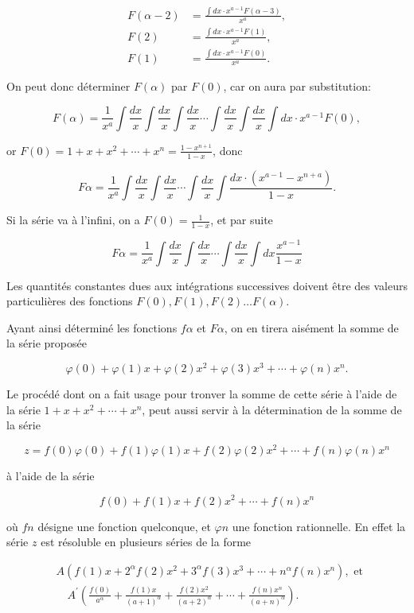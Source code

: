 \documentclass{article}
\begin{document}
\[
\begin{aligned}
F(\alpha-2) & =\frac{\int d x \cdot x^{a-1} F(\alpha-3)}{x^{a}}, \\
F(2) & =\frac{\int d x \cdot x^{a-1} F(1)}{x^{a}}, \\
F(1) & =\frac{\int d x \cdot x^{a-1} F(0)}{x^{a}} .
\end{aligned}
\]

On peut donc déterminer \(F(\alpha)\) par \(F(0)\), car on aura par substitution:

\[
F(\alpha)=\frac{1}{x^{a}} \int \frac{d x}{x} \int \frac{d x}{x} \int \frac{d x}{x} \cdots \int \frac{d x}{x} \int \frac{d x}{x} \int d x \cdot x^{a-1} F(0),
\]

or \(F(0)=1+x+x^{2}+\cdots+x^{n}=\frac{1-x^{n+1}}{1-x}\), donc

\[
F \alpha=\frac{1}{x^{a}} \int \frac{d x}{x} \int \frac{d x}{x} \cdots \int \frac{d x}{x} \int \frac{d x \cdot\left(x^{a-1}-x^{n+a}\right)}{1-x} .
\]

Si la série va à l'infini, on a \(F(0)=\frac{1}{1-x}\), et par suite

\[
F \alpha=\frac{1}{x^{a}} \int \frac{d x}{x} \int \frac{d x}{x} \cdots \int \frac{d x}{x} \int d x \frac{x^{a-1}}{1-x}
\]

Les quantités constantes dues aux intégrations successives doivent être des valeurs particulières des fonctions \(F(0), F(1), F(2) \ldots F(\alpha)\).

Ayant ainsi déterminé les fonctions \(f \alpha\) et \(F \alpha\), on en tirera aisément la somme de la série proposée

\[
\varphi(0)+\varphi(1) x+\varphi(2) x^{2}+\varphi(3) x^{3}+\cdots+\varphi(n) x^{n} .
\]

Le procédé dont on a fait usage pour tronver la somme de cette série à l'aide de la série \(1+x+x^{2}+\cdots+x^{n}\), peut aussi servir à la détermination de la somme de la série

\[
z=f(0) \varphi(0)+f(1) \varphi(1) x+f(2) \varphi(2) x^{2}+\cdots+f(n) \varphi(n) x^{n}
\]

à l'aide de la série

\[
f(0)+f(1) x+f(2) x^{2}+\cdots+f(n) x^{n}
\]

où \(f n\) désigne une fonction quelconque, et \(\varphi n\) une fonction rationnelle. En effet la série \(z\) est résoluble en plusieurs séries de la forme

\[
\begin{aligned}
& A\left(f(1) x+2^{\alpha} f(2) x^{2}+3^{\alpha} f(3) x^{3}+\cdots+n^{\alpha} f(n) x^{n}\right), \text { et } \\
& \quad A^{\prime}\left(\frac{f(0)}{a^{\alpha}}+\frac{f(1) x}{(a+1)^{\alpha}}+\frac{f(2) x^{2}}{(a+2)^{\alpha}}+\cdots+\frac{f(n) x^{n}}{(a+n)^{\alpha}}\right) .
\end{aligned}
\]
\end{document}
